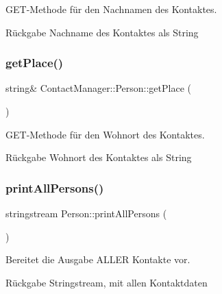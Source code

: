 G\+E\+T-\/\+Methode für den Nachnamen des Kontaktes.

\begin{DoxyReturn}{Rückgabe}
Nachname des Kontaktes als String
\end{DoxyReturn}
\mbox{\label{classContactManager_1_1Person_abc73080d9a92362af3ef25183d7186e5}} 
\subsubsection{\texorpdfstring{get\+Place()}{getPlace()}}
{\footnotesize\ttfamily string\& Contact\+Manager\+::\+Person\+::get\+Place (\begin{DoxyParamCaption}{ }\end{DoxyParamCaption})\hspace{0.3cm}{\ttfamily [inline]}}



G\+E\+T-\/\+Methode für den Wohnort des Kontaktes.

\begin{DoxyReturn}{Rückgabe}
Wohnort des Kontaktes als String
\end{DoxyReturn}
\mbox{\label{classContactManager_1_1Person_a781616d2e1b0ebe4601b3914d4a03bc3}} 
\subsubsection{\texorpdfstring{print\+All\+Persons()}{printAllPersons()}}
{\footnotesize\ttfamily stringstream Person\+::print\+All\+Persons (\begin{DoxyParamCaption}{ }\end{DoxyParamCaption})}



Bereitet die Ausgabe A\+L\+L\+ER Kontakte vor.

\begin{DoxyReturn}{Rückgabe}
Stringstream, mit allen Kontaktdaten
\end{DoxyReturn}
\mbox{\label{classContactManager_1_1Person_ab1be17c0aac5d094a6fd94d9e1fa7ed4}} 
